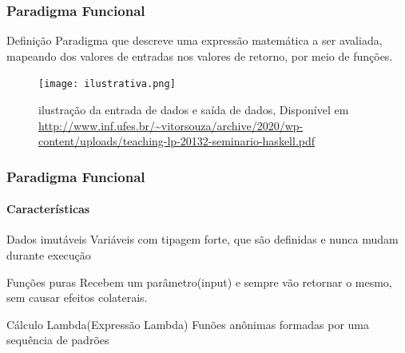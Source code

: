 \documentclass[aspectratio=169]{beamer}
\begin{document}
    \begin{frame}
      \frametitle{Paradigma Funcional}

      \begin{block}{Definição}
        Paradigma que descreve uma expressão matemática a ser avaliada,
        mapeando dos valores de entradas nos valores de retorno, por meio de funções.
      \end{block} \pause 

    \begin{figure}
      \texttt{[image: ilustrativa.png]}
      \caption{\centering ilustração da entrada de dados e saída de dados, Disponível em \url{http://www.inf.ufes.br/~vitorsouza/archive/2020/wp-content/uploads/teaching-lp-20132-seminario-haskell.pdf}}
    \end{figure}
       
    \end{frame}

    \begin{frame}
      \frametitle{Paradigma Funcional}
      \framesubtitle{Características}

      \begin{block}{Dados imutáveis}
        Variáveis com tipagem forte, que são definidas e nunca mudam durante
        execução
      \end{block} \pause 

      \begin{block}{Funções puras}
        Recebem um parâmetro(input) e sempre vão retornar o mesmo, sem causar efeitos colaterais.
      \end{block} \pause 

      \begin{block}{Cálculo Lambda(Expressão Lambda)}
        Funões anônimas formadas por uma sequência de padrões
      \end{block} 
       
    \end{frame}
\end{document}
